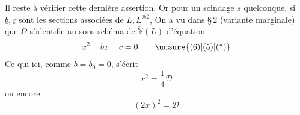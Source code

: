 Il reste à vérifier cette dernière assertion.
Or pour un scindage $s$ quelconque, si $\underline b,\underline c$ sont
les sections associées de $L,L^{\otimes2}$, On a vu
dans \S\,2 (variante marginale) que $\Omega$ s'identifie
au sous-schéma de $\check{\mathbb V}(L)$ d'équation
\[
x^2-bx+c=0\tag*{\unsure{(6)|(5)|(*)}}
\]
Ce qui ici,  comme $b=b_0=0$, s'écrit
\[
x^2=\frac14\mathcal D
\]
ou encore
\[
(2x)^2=\mathcal D
\]
